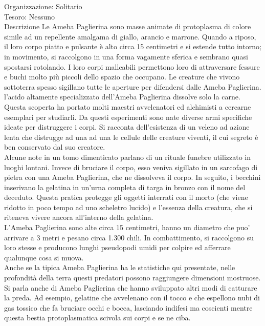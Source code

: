 \begin{multicols}{2}
Organizzazione: Solitario\\
Tesoro: Nessuno\\
Descrizione
Le Ameba Paglierina sono masse animate di protoplasma di colore simile ad un repellente amalgama di giallo, arancio e marrone. Quando a riposo, il loro corpo piatto e pulsante è alto circa 15 centimetri e si estende tutto intorno; in movimento, si raccolgono in una forma vagamente sferica e sembrano quasi spostarsi rotolando. I loro corpi malleabili permettono loro di attraversare fessure e buchi molto più piccoli dello spazio che occupano. Le creature che vivono sottoterra spesso sigillano tutte le aperture per difendersi dalle Ameba Paglierina.\\

l'acido altamente specializzato dell'Ameba Paglierina dissolve solo la carne. Questa scoperta ha portato molti maestri avvelenatori ed alchimisti a cercarne esemplari per studiarli. Da questi esperimenti sono nate diverse armi specifiche ideate per distruggere i corpi. Si racconta dell'esistenza di un veleno ad azione lenta che distrugge ad una ad una le cellule delle creature viventi, il cui segreto è ben conservato dal suo creatore.\\

Alcune note in un tomo dimenticato parlano di un rituale funebre utilizzato in luoghi lontani. Invece di bruciare il corpo, esso veniva sigillato in un sarcofago di pietra con una Ameba Paglierina, che ne dissolveva il corpo. In seguito, i becchini inserivano la gelatina in un’urna completa di targa in bronzo con il nome del deceduto. Questa pratica protegge gli oggetti interrati con il morto (che viene ridotto in poco tempo ad uno scheletro lucido) e l'essenza della creatura, che si riteneva vivere ancora all'interno della gelatina.\\

L'Ameba Paglierina sono alte circa 15 centimetri, hanno un diametro che puo' arrivare a 3 metri e pesano circa 1.300 chili. In combattimento, si raccolgono su loro stesse e producono lunghi pseudopodi umidi per colpire ed afferrare qualunque cosa si muova.\\

Anche se la tipica Ameba Paglierina ha le statistiche qui presentate, nelle profondità della terra questi predatori possono raggiungere dimensioni mostruose. Si parla anche di Ameba Paglierina che hanno sviluppato altri modi di catturare la preda. Ad esempio, gelatine che avvelenano con il tocco e che espellono nubi di gas tossico che fa bruciare occhi e bocca, lasciando indifesi ma coscienti mentre questa bestia protoplasmatica scivola sui corpi e se ne ciba.


\end{multicols}
